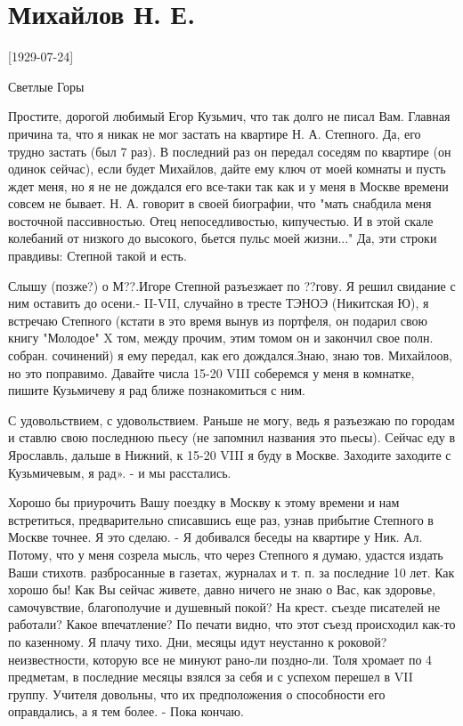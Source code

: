 \documentclass[]{memoir}
\begin{document}
\section{Михайлов Н. Е.}

[1929-07-24]

Светлые Горы

Простите, дорогой любимый Егор Кузьмич, что так долго не писал Вам. Главная причина та, что я никак не мог застать на квартире Н. А. Степного.
Да, его трудно застать (был 7 раз). В последний раз он передал соседям по квартире (он одинок сейчас), если будет Михайлов, дайте ему ключ от моей комнаты и пусть ждет меня, но я не не дождался его все-таки так как и у меня в Москве времени совсем не бывает. Н. А. говорит в своей биографии, что "мать снабдила меня восточной пассивностью. Отец непоседливостью, кипучестью. И в этой скале колебаний от низкого до высокого, бьется пульс моей жизни..."
Да, эти строки правдивы: Степной такой и есть.

Слышу (позже?) о М??.Игоре Степной разъезжает по ??гову. Я решил свидание с ним оставить до осени.-
II-VII, случайно в тресте ТЭНОЭ (Никитская Ю), я встречаю Степного (кстати в это время вынув из портфеля, он подарил свою книгу "Молодое" X том, между прочим, этим томом он и закончил свое полн. собран. сочинений) я ему передал, как его дождался.Знаю, знаю тов. Михайлоов, но это поправимо.
Давайте числа 15-20 VIII соберемся у меня в комнатке, пишите Кузьмичеву я рад ближе познакомиться с ним.

С удовольствием, с удовольствием. Раньше не могу, ведь я разъезжаю по городам и ставлю свою последнюю пьесу (не запомнил названия это пьесы). Сейчас еду в Ярославль, дальше в Нижний, к 15-20 VIII я буду в Москве. Заходите заходите с Кузьмичевым, я рад». - и мы расстались.

Хорошо бы приурочить Вашу поездку в Москву к этому времени и нам встретиться, предварительно списавшись еще раз, узнав прибытие Степного в Москве точнее.  Я это сделаю. - Я добивался беседы на квартире у Ник. Ал. Потому, что у меня созрела мысль, что через Степного я думаю, удастся издать Ваши стихотв. разбросанные в газетах, журналах и т. п. за последние 10 лет. 
Как хорошо бы!
Как Вы сейчас живете, давно ничего не знаю о Вас, как здоровье, самочувствие, благополучие и душевный покой?
На крест. съезде писателей не работали? Какое впечатление? По печати видно, что этот съезд происходил как-то по казенному. Я плачу тихо. Дни, месяцы идут неустанно к роковой? неизвестности, которую все не минуют рано-ли поздно-ли.
Толя хромает по 4 предметам, в последние месяцы взялся за себя и с успехом перешел в VII группу. Учителя довольны, что их предположения о способности его оправдались, а я тем более. -  Пока кончаю.
\end{document}
